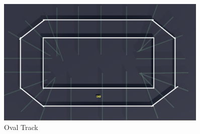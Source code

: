 \begin{figure}[H]
  \centering
  \includegraphics[width=0.90\textwidth]{images/tracks/OvalTrack.png}
  \caption{ Oval Track}
  \label{fig:ovaltrack}
\end{figure}
